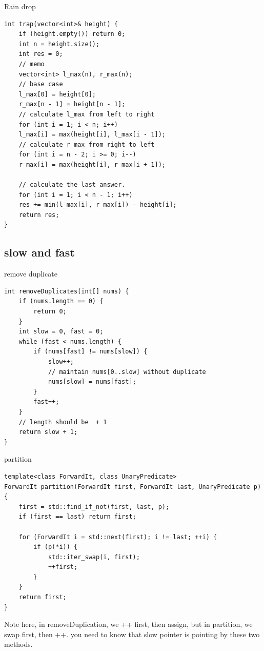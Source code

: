 \documentclass[a4paper,11pt,twoside]{book}
\begin{document}
	\par Rain drop
	
\begin{lstlisting}[breaklines]
int trap(vector<int>& height) {
	if (height.empty()) return 0;
	int n = height.size();
	int res = 0;
	// memo
	vector<int> l_max(n), r_max(n);
	// base case
	l_max[0] = height[0];
	r_max[n - 1] = height[n - 1];
	// calculate l_max from left to right
	for (int i = 1; i < n; i++)
	l_max[i] = max(height[i], l_max[i - 1]);
	// calculate r_max from right to left
	for (int i = n - 2; i >= 0; i--) 
	r_max[i] = max(height[i], r_max[i + 1]);
	
	// calculate the last answer.
	for (int i = 1; i < n - 1; i++) 
	res += min(l_max[i], r_max[i]) - height[i];
	return res;
}
\end{lstlisting}



\subsection{slow and fast}

	\par remove duplicate
\begin{lstlisting}[breaklines]
int removeDuplicates(int[] nums) {
	if (nums.length == 0) {
		return 0;
	}
	int slow = 0, fast = 0;
	while (fast < nums.length) {
		if (nums[fast] != nums[slow]) {
			slow++;
			// maintain nums[0..slow] without duplicate
			nums[slow] = nums[fast];
		}
		fast++;
	}
	// length should be  + 1
	return slow + 1;
}
\end{lstlisting}

	\par partition
\begin{lstlisting}[breaklines]
template<class ForwardIt, class UnaryPredicate>
ForwardIt partition(ForwardIt first, ForwardIt last, UnaryPredicate p)
{
	first = std::find_if_not(first, last, p);
	if (first == last) return first;
	
	for (ForwardIt i = std::next(first); i != last; ++i) {
		if (p(*i)) {
			std::iter_swap(i, first);
			++first;
		}
	}
	return first;
}
\end{lstlisting}

	\par Note here, in removeDuplication, we ++ first, then assign, but in partition, we swap first, then ++. you need to know that slow pointer is pointing by these two methods. 

	
\end{document}
